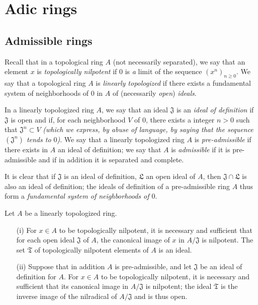 \section{Adic rings}
\label{section-adic-rings}

\subsection{Admissible rings}
\label{subsection-admissible-rings}

\begin{env}[7.1.1]
\label{env-0.7.1.1}
Recall that in a topological ring $A$ (not necessarily separated), we say that an element $x$
is {\em topologically nilpotent} if $0$ is {\em a} limit of the sequence
$(x^n)_{n\geqslant 0}$. We say that a topological ring $A$ is {\em linearly topologized} if
there exists a fundamental system of neighborhoods of $0$ in $A$ of (necessarily {\em open})
{\em ideals}.
\end{env}

\begin{defn}[7.1.2]
\label{defn-0.7.1.2}
In a linearly topologized ring $A$, we say that an ideal $\mathfrak{J}$ is an {\em ideal of
definition} if $\mathfrak{J}$ is open and if, for each neighborhood $V$ of $0$, there exists
a integer $n>0$ such
that $\mathfrak{J}^n\subset V$ {\em (which we express, by abuse of language, by saying that
the sequence $(\mathfrak{J}^n)$ {\em tends to $0$})}. We say that a linearly topologized
ring $A$ is {\em pre-admissible} if there exists in $A$ an ideal of definition; we say that
$A$ is {\em admissible} if it is pre-admissible and if in addition it is separated and
complete.
\end{defn}

It is clear that if $\mathfrak{J}$ is an ideal of definition, $\mathfrak{L}$ an open ideal of
$A$, then $\mathfrak{J}\cap\mathfrak{L}$ is also an ideal of definition; the ideals of
definition of a pre-admissible ring $A$ thus form a {\em fundamental system of neighborhoods
of $0$}.

\begin{lem}[7.1.3]
\label{lem-0.7.1.3}
Let $A$ be a linearly topologized ring.
\begin{itemize}
  \item[{\rm(i)}] For $x\in A$ to be topologically nilpotent, it is necessary and sufficient that for
    each open ideal $\mathfrak{J}$ of $A$, the canonical image of $x$ in $A/\mathfrak{J}$ is
    nilpotent. The set $\mathfrak{T}$ of topologically nilpotent elements of $A$ is an ideal.
  \item[{\rm(ii)}] Suppose that in addition $A$ is pre-admissible, and let $\mathfrak{J}$ be an ideal
     of definition for $A$. For $x\in A$ to be topologically nilpotent, it is necessary and
     sufficient that its canonical image in $A/\mathfrak{J}$ is nilpotent; the ideal
     $\mathfrak{T}$ is the inverse image of the nilradical of $A/\mathfrak{J}$ and is thus open.
\end{itemize}
\end{lem}

